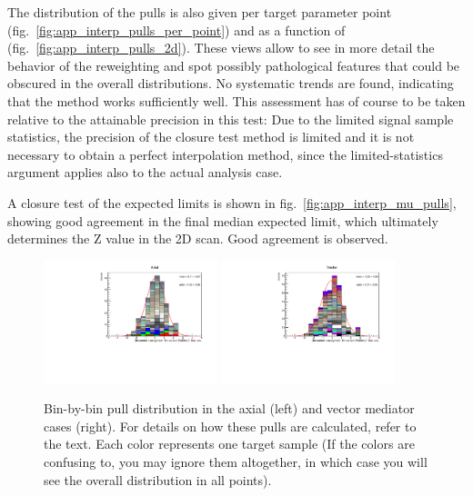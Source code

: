 The distribution of the pulls is also given per target parameter point (fig.~\ref{fig:app_interp_pulls_per_point}) and as a function of \MET (fig.~\ref{fig:app_interp_pulls_2d}). These views allow to see in more detail the behavior of the reweighting and spot possibly pathological features that could be obscured in the overall distributions. No systematic trends are found, indicating that the method works sufficiently well. This assessment has of course to be taken relative to the attainable precision in this test: Due to the limited signal sample statistics, the precision of the closure test method is limited and it is not necessary to obtain a perfect interpolation method, since the limited-statistics argument applies also to the actual analysis case.

A closure test of the expected limits is shown in fig.~\ref{fig:app_interp_mu_pulls}, showing good agreement in the final median expected limit, which ultimately determines the Z value in the 2D scan.  Good agreement is observed.


 \begin{figure}[htbp]
   \begin{center}
	\includegraphics[width=0.45\textwidth]{figures/interpolation_appendix/Axial_pulls.pdf}
	\includegraphics[width=0.45\textwidth]{figures/interpolation_appendix/Vector_pulls.pdf}
     \caption{Bin-by-bin pull distribution in the axial (left) and vector mediator cases (right).
				For details on how these pulls are calculated, refer to the text. Each color represents one target sample
				(If the colors are confusing to, you may ignore them altogether, in which case you will see the overall distribution in all points).}
     \label{fig:app_interp_pulls}
   \end{center}
 \end{figure}

